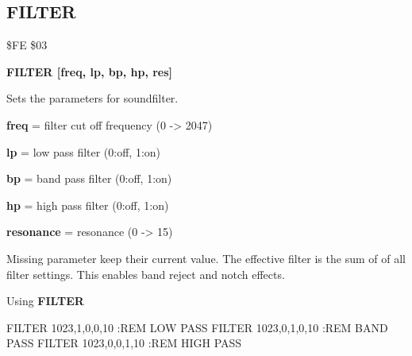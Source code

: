 \newpage
\subsection{FILTER}
\begin{description}[leftmargin=3cm,style=nextline]
\item [Token:] \$FE \$03
\item [Format:] {\bf FILTER [freq, lp, bp, hp, res]}
\item [Usage:] Sets
               the parameters for soundfilter.

      {\bf freq} = filter cut off frequency (0 -> 2047)

      {\bf lp} = low pass filter (0:off, 1:on)

      {\bf bp} = band pass filter (0:off, 1:on)

      {\bf hp} = high pass filter (0:off, 1:on)

      {\bf resonance} = resonance (0 -> 15)

\item [Remarks:] Missing parameter keep their current value.
                 The effective filter is the sum of
                 of all filter settings.
                 This enables band reject and notch effects.

\item [Example:]
                Using {\bf FILTER}
\begin{screenoutput}
FILTER 1023,1,0,0,10 :REM LOW PASS
FILTER 1023,0,1,0,10 :REM BAND PASS
FILTER 1023,0,0,1,10 :REM HIGH PASS
\end{screenoutput}
\end{description}


\newpage
